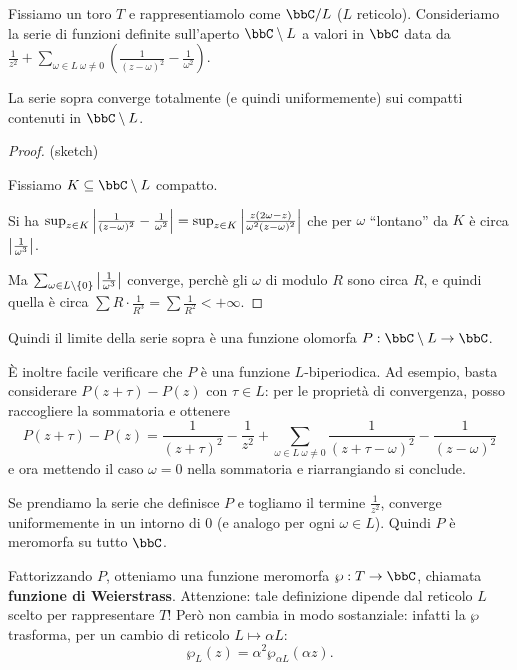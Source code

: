 Fissiamo un toro $T$ e rappresentiamolo come $\bbC/L$ ($L$ reticolo).
Consideriamo la serie di funzioni definite sull'aperto $\bbC\setminus L$ a valori in $\bbC$ data da $\frac{1}{z^2}+\sum_{\omega\in L\ \omega\not=0}(\frac{1}{(z-\omega)^2}-\frac{1}{\omega^2})$.

\begin{proposizione}
La serie sopra converge totalmente (e quindi uniformemente) sui compatti contenuti in $\bbC\setminus L$.
\end{proposizione}
\begin{proof}(sketch)

Fissiamo $K\subseteq\bbC\setminus L$ compatto.

Si ha $\sup_{z\in K}\left| \frac{1}{(z-\omega)^2}-\frac{1}{\omega^2} \right|=\sup_{z\in K}\left| \frac{z(2\omega-z)}{\omega^2(z-\omega)^2} \right|$ che per $\omega$ ``lontano'' da $K$ è circa $\left| \frac{1}{\omega^3} \right|$.

Ma $\sum_{\omega\in L\setminus\{0\}}\left| \frac{1}{\omega^3} \right|$ converge, perchè
gli $\omega$ di modulo $R$ sono circa $R$, e quindi quella è circa $\sum R\cdot\frac{1}{R^3}=\sum\frac{1}{R^2}<+\infty$.
\end{proof}

Quindi il limite della serie sopra è una funzione olomorfa $P:\bbC\setminus L\rar\bbC$.

È inoltre facile verificare che $P$ è una funzione $L$-biperiodica.
Ad esempio, basta considerare $P(z+\tau)-P(z)$ con $\tau \in L$: per le proprietà di convergenza, posso raccogliere la sommatoria e ottenere
\[ P(z+\tau) - P(z) = \frac1{(z+\tau)^2} - \frac1{z^2} + \sum_{\omega \in L\ \omega\ne 0} \frac1{(z+\tau-\omega)^2}-\frac1{(z-\omega)^2}\]
e ora mettendo il caso $\omega=0$ nella sommatoria e riarrangiando si conclude.

Se prendiamo la serie che definisce $P$ e togliamo il termine $\frac{1}{z^2}$, converge uniformemente in un intorno di $0$ (e analogo per ogni $\omega\in L$).
Quindi $P$ è meromorfa su tutto $\bbC$.

Fattorizzando $P$, otteniamo una funzione meromorfa $\wp:T\rar\bbC$, chiamata \textbf{funzione di Weierstrass}. Attenzione: tale definizione dipende dal reticolo $L$ scelto per rappresentare $T$! Però non cambia in modo sostanziale: infatti la $\wp$ trasforma, per un cambio di reticolo $L \mapsto \alpha L$:
\[
	\wp_L(z) = \alpha^2 \wp_{\alpha L}(\alpha z).
\]

